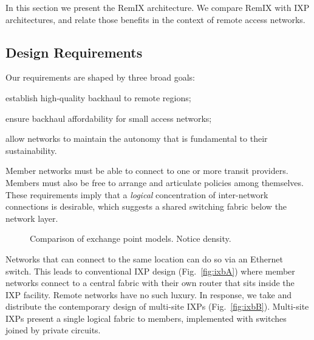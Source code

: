 In this section we present the RemIX architecture. We compare RemIX with IXP architectures, and relate those
benefits in the context of remote access networks.

\subsection{Design Requirements}

Our requirements are shaped by three broad goals:
\begin{inparaenum}[(i)]
  \item establish high-quality backhaul to remote regions;
  \item ensure backhaul affordability for small access networks;
  \item allow networks to maintain the autonomy that is
    fundamental to their sustainability.
\end{inparaenum}
Member networks must be able to connect to one or more transit
providers. Members must also be free to arrange and articulate
policies among themselves. These requirements imply that a
\emph{logical} concentration of inter-network connections is
desirable, which suggests a shared switching fabric below the network
layer.

\begin{figure*}
   \hspace{\hfill}
   \hspace{\hfill}
  \subfloat[RemIX]{
    \resizebox{0.45\columnwidth}{!}{
      \begin{tikzpicture}
        \ixboxesC
      \end{tikzpicture}
      \label{fig:ixbC}
    }
  }
  \caption{Comparison of exchange point models. Notice density.}
  \label{fig:ixb}
\end{figure*}

Networks that can connect to the same location can do so
via an Ethernet switch. This leads to conventional \ac{IXP}
design (Fig.~\ref{fig:ixbA}) where member networks connect to a
central fabric with their own router that sits inside the IXP
facility. Remote networks have no such luxury. In response, we
take and distribute the contemporary design of multi-site \acp{IXP}
(Fig.~\ref{fig:ixbB}). Multi-site \acp{IXP} present a single
logical fabric to members, implemented with switches
joined by private circuits.

